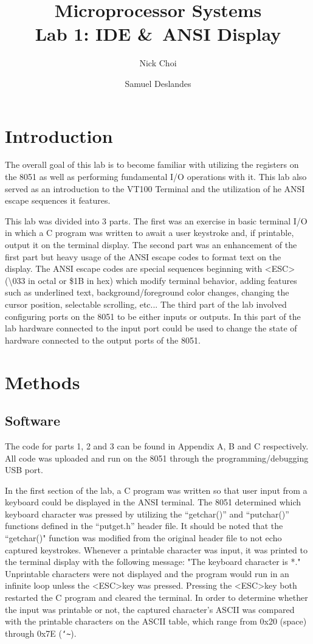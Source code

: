 \documentclass[12pt]{article}
\begin{document}
\title{Microprocessor Systems \\ Lab 1: IDE \&\ ANSI Display}
\author{Nick Choi \and Samuel Deslandes}
\date{}
\maketitle

\section{Introduction}
The overall goal of this lab is to become familiar with utilizing the registers on the 8051 as well as performing fundamental I/O operations with it. This lab also served as an introduction to the VT100 Terminal and the utilization of he ANSI escape sequences it features. 

This lab was divided into 3 parts. The first was an exercise in basic terminal I/O in which a C program was written to await a user keystroke and, if printable, output it on the terminal display. The second part was an enhancement of the first part but heavy usage of the ANSI escape codes to format text on the display. The ANSI escape codes are special sequences beginning with \textless ESC\textgreater (\textbackslash033 in octal or \$1B in hex) which modify terminal behavior, adding features such as underlined text, background/foreground color changes, changing the cursor position, selectable scrolling, etc... The third part of the lab involved configuring ports on the 8051 to be either inputs or outputs. In this part of the lab hardware connected to the input port could be used to change the state of hardware connected to the output ports of the 8051. 

\section{Methods}
\subsection{Software}
The code for parts 1, 2 and 3 can be found in Appendix A, B and C respectively. All code was uploaded and run on the 8051 through the programming/debugging USB port. 	

In the first section of the lab, a C program was written so that user input from a keyboard could be displayed in the ANSI terminal. The 8051 determined which keyboard character was pressed by utilizing the ``getchar()'' and ``putchar()'' functions defined in the ``putget.h'' header file. It should be noted that the ``getchar()" function was modified from the original header file to not echo captured keystrokes. Whenever a printable character was input, it was printed to the terminal display with the following message: "The keyboard character is *."  Unprintable characters were not displayed and the program would run in an infinite loop unless the \textless ESC\textgreater key was pressed. Pressing the \textless ESC\textgreater key both restarted the C program and cleared the terminal. In order to determine whether the input was printable or not, the captured character's ASCII was compared with the printable characters on the ASCII table, which range from 0x20 (space) through 0x7E (\texttt{\char`\~}).
\end{document}
